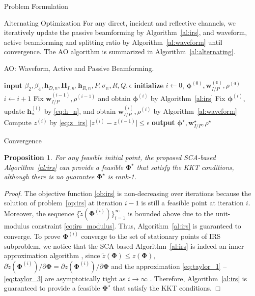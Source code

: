 \documentclass[journal]{IEEEtran}
\newtheorem{proposition}{Proposition}
\begin{document}
\begin{section}{Problem Formulation}
		\begin{subsection}{Alternating Optimization}
			For any direct, incident and reflective channels, we iteratively update the passive beamforming by Algorithm~\ref{al:irs}, and waveform, active beamforming and splitting ratio by Algorithm~\ref{al:waveform} until convergence. The AO algorithm is summarized in Algorithm~\ref{al:alternating}.
			\begin{algorithm}[!t]
				\caption{AO: Waveform, Active and Passive Beamforming.}
				\label{al:alternating}
				\begin{algorithmic}[1]
					\State \textbf{input} $\beta_2,\beta_4,\boldsymbol{h}_{D,n},\boldsymbol{H}_{I,n},\boldsymbol{h}_{R,n},P,\sigma_n,\bar{R},Q,\epsilon$
					\State \textbf{initialize} $i \gets 0$, $\boldsymbol{\phi}^{(0)},\boldsymbol{w}_{I/P}^{(0)},\rho^{(0)}$
					\Repeat
						\State $i \gets i + 1$
						\State Fix $\boldsymbol{w}_{I/P}^{(i-1)},\rho^{(i-1)}$ and obtain $\boldsymbol{\phi}^{(i)}$ by Algorithm~\ref{al:irs}
						\State Fix $\boldsymbol{\phi}^{(i)}$, update $\boldsymbol{h}_n^{(i)}$ by \ref{eq:h_n}, and obtain $\boldsymbol{w}_{I/P}^{(i)}, \rho^{(i)}$ by Algorithm~\ref{al:waveform}
						\State Compute $z^{(i)}$ by \ref{eq:z_irs}
					\Until $\lvert z^{(i)} - z^{(i-1)} \rvert \le \epsilon$
					\State \textbf{output} $\boldsymbol{\phi}^{\star}, \boldsymbol{w}_{I/P}^{\star}, \rho^{\star}$
				\end{algorithmic}
			\end{algorithm}
		\end{subsection}


		\begin{subsection}{Convergence}
			\begin{proposition}\label{pr:irs}
				For any feasible initial point, the proposed SCA-based Algorithm~\ref{al:irs} can provide a feasible $\boldsymbol{\Phi}^{\star}$ that satisfy the KKT conditions, although there is no guarantee $\boldsymbol{\Phi}^{\star}$ is rank-\num{1}.
			\end{proposition}

			\begin{proof}\label{pf:irs}
				The objective function \ref{ob:irs} is non-decreasing over iterations because the solution of problem~\ref{op:irs} at iteration $i-1$ is still a feasible point at iteration $i$. Moreover, the sequence $\{\tilde{z}(\boldsymbol{\Phi}^{(i)})\}_{i=1}^{\infty}$ is bounded above due to the unit-modulus constraint \ref{co:irs_modulus}. Thus, Algorithm~\ref{al:irs} is guaranteed to converge. To prove $\boldsymbol{\Phi}^{(i)}$ converge to the set of stationary points of IRS subproblem, we notice that the SCA-based Algorithm~\ref{al:irs} is indeed an inner approximation algorithm \cite{Marks1978}, since $\tilde{z}(\boldsymbol{\Phi}) \le z(\boldsymbol{\Phi})$, $\partial\tilde{z}(\boldsymbol{\Phi}^{(i)})/\partial\boldsymbol{\Phi}=\partial z(\boldsymbol{\Phi}^{(i)})/\partial\boldsymbol{\Phi}$ and the approximation \ref{eq:taylor_1} -- \ref{eq:taylor_3} are asymptotically tight as $i \to \infty$ \cite{Li2013}. Therefore, Algorithm~\ref{al:irs} is guaranteed to provide a feasible $\boldsymbol{\Phi}^{\star}$ that satisfy the KKT conditions.
			\end{proof}


\end{subsection}
\end{section}
\end{document}
